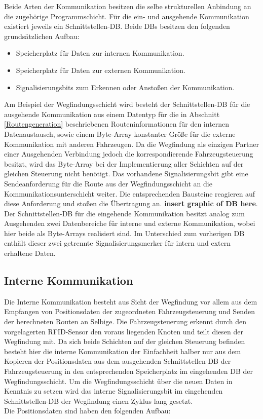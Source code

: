 		Beide Arten der Kommunikation besitzen die selbe strukturellen Anbindung an die zugehörige Programmschicht. Für die ein- und ausgehende Kommunikation existiert jeweils ein Schnittstellen-\ac{DB}. Beide \ac{DB}s besitzen den folgenden grundsätzlichen Aufbau:
		
		\begin{itemize}
			\item Speicherplatz für Daten zur internen Kommunikation.
			\item Speicherplatz für Daten zur externen Kommunikation.
			\item Signalisierungsbits zum Erkennen oder Anstoßen der Kommunikation.
		\end{itemize}
		
		Am Beispiel der Wegfindungsschicht wird besteht der Schnittstellen-\ac{DB} für die ausgehende Kommunikation aus einem Datentyp für die in Abschnitt \ref{Routengeneration} beschriebenen Routeninformationen für den internen Datenaustausch, sowie einem Byte-Array konstanter Größe für die externe Kommunikation mit anderen Fahrzeugen. Da die Wegfindung  als einzigen Partner einer Ausgehenden Verbindung jedoch die korrespondierende Fahrzeugsteuerung  besitzt, wird das Byte-Array bei der Implementierung aller Schichten auf der gleichen Steuerung nicht benötigt. Das vorhandene Signalisierungsbit gibt eine Sendeanforderung für die Route aus der Wegfindungsschicht an die Kommunikationsunterschicht weiter.  Die entsprechenden Bausteine reagieren auf diese Anforderung und stoßen die Übertragung an. \textbf{insert graphic of DB here}.
		\\
		Der Schnittstellen-DB für die eingehende Kommunikation besitzt analog zum Ausgehenden zwei Datenbereiche für interne und externe Kommunikation, wobei hier beide als Byte-Arrays realisiert sind. Im Unterschied zum vorherigen \ac{DB} enthält dieser zwei getrennte Signalisierungsmerker für intern und extern erhaltene Daten.
		
	\subsection{Interne Kommunikation}
		\label{Interne Kommunikation}
		Die Interne Kommunikation besteht aus Sicht der Wegfindung vor allem aus dem Empfangen von Positionsdaten der zugeordneten Fahrzeugsteuerung und Senden der berechneten Routen an Selbige. Die Fahrzeugsteuerung erkennt durch den vorgelagerten \ac{RFID}-Sensor den voraus liegenden Knoten und teilt diesen der Wegfindung mit. Da sich beide Schichten auf der gleichen Steuerung befinden besteht hier die interne Kommunikation der Einfachheit halber nur aus dem Kopieren der Positionsdaten aus dem ausgehenden Schnittstellen-\ac{DB} der Fahrzeugsteuerung in den entsprechenden Speicherplatz im eingehenden \ac{DB} der Wegfindungsschicht. Um die Wegfindungsschicht über die neuen Daten in Kenntnis zu setzen wird das  interne Signalisierungsbit im eingehenden Schnittstellen-\ac{DB} der Wegfindung einen Zyklus lang gesetzt.
		\\
		Die Positionsdaten sind haben den folgenden Aufbau:
		
